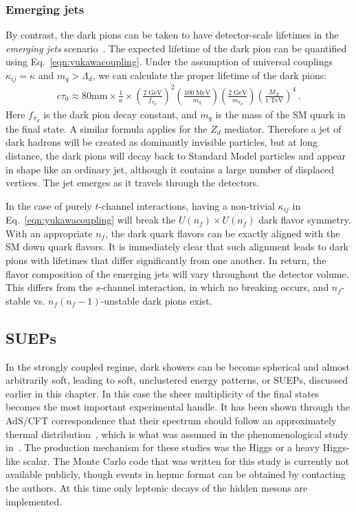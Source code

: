 \subsubsection{Emerging jets}
By contrast, the dark pions can be taken to have detector-scale lifetimes in the {\em emerging jets} scenario~\cite{Schwaller:2015gea}. The expected lifetime of the dark pion can be quantified using Eq.~\ref{eqn:yukawacoupling}. Under the assumption of universal couplings $\kappa_{ij} = \kappa$ and $m_{q} > \Lambda_{d}$, we can calculate the proper lifetime of the dark pions:
%
\begin{align}
	c \tau_{0} \approx 80 \mathrm{mm} \times \frac{1}{\kappa} \times \left( \frac{2 \;\mathrm{GeV}}{f_{\pi_{d}}} \right)^2 \left( \frac{100 \;\mathrm{MeV}}{m_{q}} \right) \left( \frac{2\; \mathrm{GeV}}{m_{\pi_{d} }} \right) \left( \frac{M_{X}}{1 \;\mathrm{TeV}} \right)^4 \,.
\end{align}
Here $f_{\pi_{d}}$ is the dark pion decay constant, and $m_q$ is the mass of the SM quark in the final state.  A similar formula applies for the $Z_d$ mediator. Therefore a jet of dark hadrons will be created as dominantly invisible particles, but at long distance, the dark pions will decay back to Standard Model particles and appear in shape like an ordinary jet, although it contains a large number of displaced vertices. The jet emerges as it travels through the detectors.


In the case of purely $t$-channel interactions, having a non-trivial $\kappa_{ij}$ in Eq.~\ref{eqn:yukawacoupling} will break the $U(n_{f}) \times U(n_{f})$ dark flavor symmetry. With an appropriate $n_{f}$, the dark quark flavors can be exactly aligned with the SM down quark flavors. It is immediately clear that such alignment leads to dark pions with lifetimes that differ significantly from one another. In return, the flavor composition of the emerging jets will vary throughout the detector volume. This differs from the $s$-channel interaction, in which no breaking occurs, and $n_{f}$-stable vs. $n_{f}(n_{f} - 1)$-unstable dark pions exist.

\subsection{SUEPs}
In the strongly coupled regime, dark showers can be become spherical and almost arbitrarily soft, leading to soft, unclustered energy patterns, or SUEPs, discussed earlier in this chapter. In this case the sheer multiplicity of the final states becomes the most important experimental handle. It has been shown through the AdS/CFT correspondence that their spectrum should follow an approximately thermal distribution~\cite{Hatta:2008qx}, which is what was assumed in the phenomenological study in~\cite{Knapen:2016hky}. The production mechanism for these studies was the Higgs or a heavy Higgs-like scalar. The Monte Carlo code that was written for this study is currently not available publicly, though events in hepmc format can be obtained by contacting the authors. At this time only leptonic decays of the hidden mesons are implemented.
